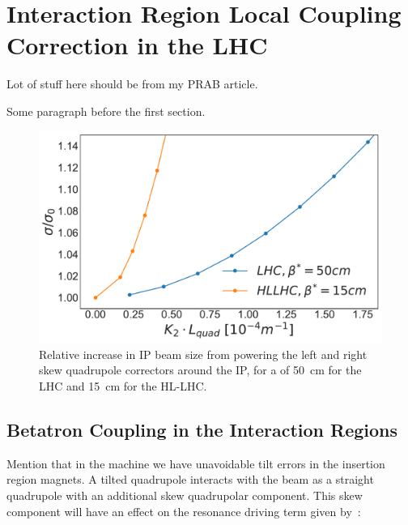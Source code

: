 \chapter{Interaction Region Local Coupling Correction in the LHC} %

\label{Chapter:IR_Local_Coupling} %

Lot of stuff here should be from my PRAB article.


Some paragraph before the first section.

\begin{figure}
    \centering
    \includegraphics*[width=0.9\linewidth]{Figures/Chapter4/lhc_vs_hllhc_ratios_normalised.pdf}
    \caption{Relative increase in IP beam size from powering the left and right skew quadrupole correctors around the IP, for a \betastar of \qty{50}{\centi\metre} for the LHC and \qty{15}{\centi\meter} for the HL-LHC.}
    \label{figure:lhc_vs_hllhc_ratios}
\end{figure}


\section{Betatron Coupling in the Interaction Regions}

Mention that in the machine we have unavoidable tilt errors in the insertion region magnets.
A tilted quadrupole interacts with the beam as a straight quadrupole with an additional skew quadrupolar component.
This skew component will have an effect on the \foneohone resonance driving term given by~\cite{PRAB:Calaga:MergingHamiltonianMatrixApproches}:

